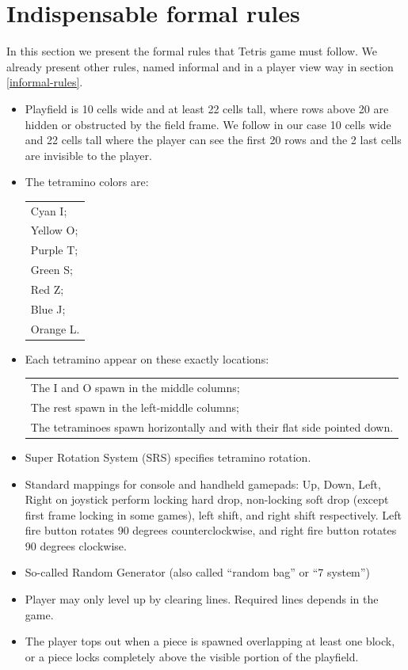 \documentclass[a4paper]{article}
\begin{document}
\newpage
\appendix

\section{Indispensable formal rules}\label{rules}
In this section we present the formal rules that Tetris game must follow. We already present other rules, named informal and in a player view way in section \ref{informal-rules}.

\begin{itemize}
	\item Playfield is 10 cells wide and at least 22 cells tall, where rows above 20 are hidden or obstructed by the field frame. We follow in our case 10 cells wide and 22 cells tall where the player can see the first 20 rows and the 2 last cells are invisible to the player. 
	\item The tetramino colors are:
	
	\begin{tabular}{l}
		Cyan I;\\
		Yellow O;\\
		Purple T;\\
		Green S;\\
		Red Z;\\
		Blue J;\\
		Orange L.\\
	\end{tabular}
	
	\item Each tetramino appear on these exactly locations:
	
	\begin{tabular}{l}
		The I and O spawn in the middle columns;\\
		The rest spawn in the left-middle columns;\\
		The tetraminoes spawn horizontally and with their flat side pointed down.\\
	\end{tabular}
	
	\item Super Rotation System (SRS) specifies tetramino rotation.
	
	\item Standard mappings for console and handheld gamepads:
	Up, Down, Left, Right on joystick perform locking hard drop, non-locking soft drop (except first frame locking in some games), left shift, and right shift respectively.
	Left fire button rotates 90 degrees counterclockwise, and right fire button rotates 90 degrees clockwise.
		
	\item So-called Random Generator (also called ``random bag'' or ``7 system'')
					
	\item Player may only level up by clearing lines. Required lines depends in the game.
			
	\item The player tops out when a piece is spawned overlapping at least one block, or a piece locks completely above the visible portion of the playfield.
	
\end{itemize}
\end{document}
